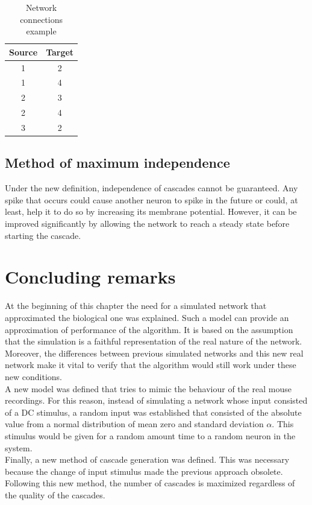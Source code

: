\begin{table}[H]
\centering
\begin{tabular}{|c|c|}
\hline
Source & Target \\ \hline
1      & 2      \\ \hline
1      & 4      \\ \hline
2      & 3      \\ \hline
2      & 4      \\ \hline
3      & 2      \\ \hline
\end{tabular}
\caption{Network connections example}
\label{tab:quality_cascades}
\end{table}


\subsection{Method of maximum independence}

Under the new definition, independence of cascades cannot be guaranteed. Any spike that occurs could cause another neuron to spike in the future or could, at least, help it to do so by increasing its membrane potential. However, it can be improved significantly by allowing the network to reach a steady state before starting the cascade.

\section{Concluding remarks}

At the beginning of this chapter the need for a simulated network that approximated the biological one was explained. Such a model can provide an approximation of performance of the algorithm. It is based on the assumption that the simulation is a faithful representation of the real nature of the network. Moreover, the differences between previous simulated networks and this new real network make it vital to verify that the algorithm would still work under these new conditions. \\

A new model was defined that tries to mimic the behaviour of the real mouse recordings. For this reason, instead of simulating a network whose input consisted of a DC stimulus, a random input was established that consisted of the absolute value from a normal distribution of mean zero and standard deviation \(\alpha\). This stimulus would be given for a random amount time to a random neuron in the system. \\

Finally, a new method of cascade generation was defined. This was necessary because the change of input stimulus made the previous approach obsolete. Following this new method, the number of cascades is maximized regardless of the quality of the cascades.








